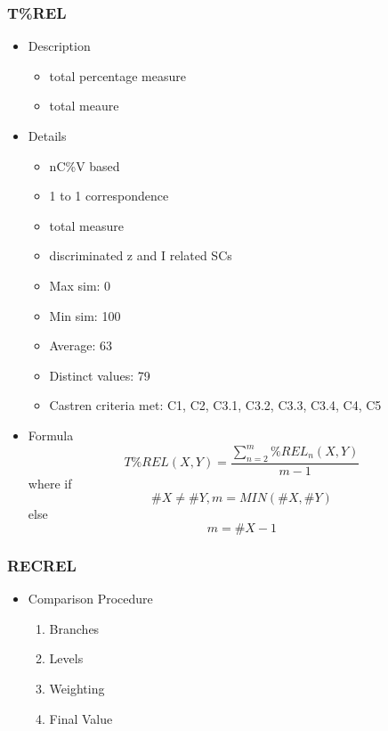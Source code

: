 \documentclass{article}
\begin{document}
\subsubsection{T\%REL}
\label{sec-6-8-2}
\begin{itemize}

\item Description
\label{sec-6-8-2-1}%
\begin{itemize}
\item total percentage measure
\item total meaure
\end{itemize}

\item Details
\label{sec-6-8-2-2}%
\begin{itemize}
\item nC\%V based
\item 1 to 1 correspondence
\item total measure
\item discriminated z and I related SCs
\item Max sim: 0
\item Min sim: 100
\item Average: 63
\item Distinct values: 79
\item Castren criteria met: C1, C2, C3.1, C3.2, C3.3, C3.4, C4, C5
\end{itemize}

\item Formula\\
\label{sec-6-8-2-3}%
$$ T\%REL(X,Y)=\frac{\sum_{n=2}^{m}{\%REL_n\left(X,Y\right)}}{m-1} $$
where
if $$ \#X\neq \#Y, m = MIN(\#X, \#Y)$$ else $$ m = \#X-1  $$
\end{itemize} %
\subsubsection{RECREL}
\label{sec-6-8-3}
\begin{itemize}

\item Comparison Procedure
\label{sec-6-8-3-1}%
\begin{enumerate}
\item Branches
\item Levels
\item Weighting
\item Final Value
\end{enumerate}
\end{itemize} %
\end{document}
